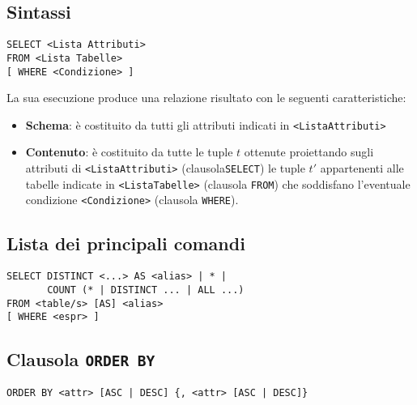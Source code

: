\documentclass[a4paper, 10pt]{article}
\theoremstyle{definition}
\begin{document}
		\subsection{Sintassi}
		\begin{lstlisting}
SELECT <Lista Attributi>
FROM <Lista Tabelle>
[ WHERE <Condizione> ]
		\end{lstlisting}
		La sua esecuzione produce una relazione risultato
		con le seguenti caratteristiche:
		\begin{itemize}
			\item \textbf{Schema}: è costituito da tutti gli attributi indicati in \lstinline|<ListaAttributi>|
			\item \textbf{Contenuto}: è costituito da tutte le tuple $t$ ottenute proiettando
			sugli attributi di \lstinline|<ListaAttributi>| (clausola\lstinline|SELECT|) le tuple $t'$
			appartenenti alle tabelle indicate in \lstinline|<ListaTabelle>| (clausola
			\lstinline|FROM|) che soddisfano l'eventuale condizione \lstinline|<Condizione>|
			(clausola \lstinline|WHERE|).
		\end{itemize}
		
		\newpage
		
		\subsection{Lista dei principali comandi}
		
		\begin{lstlisting}
SELECT DISTINCT <...> AS <alias> | * | 
	   COUNT (* | DISTINCT ... | ALL ...)
FROM <table/s> [AS] <alias>
[ WHERE <espr> ]
		\end{lstlisting}
	
		\subsection*{Clausola \lstinline|ORDER BY|}
		
		\begin{lstlisting}
ORDER BY <attr> [ASC | DESC] {, <attr> [ASC | DESC]}
		\end{lstlisting}
		
\end{document}
